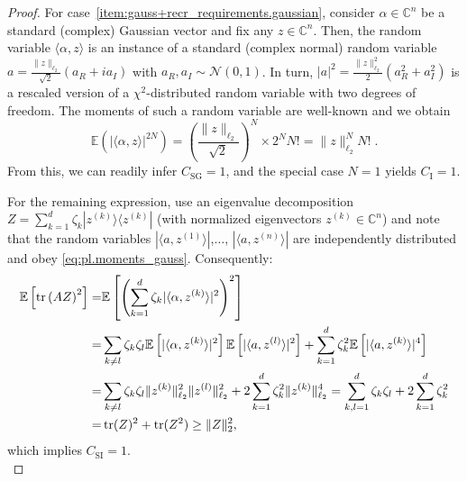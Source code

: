 \begin{proof}
  For case~\ref{item:gauss+recr_requirements.gaussian}, consider $\alpha \in \mathbb{C}^n$ be a standard (complex) Gaussian vector and fix any $ z \in \mathbb{C}^n$.
  Then, the random variable $\langle \alpha, z \rangle$ is an instance of a standard (complex normal) random variable $a = \tfrac{\|  z \|_{\ell_2}}{\sqrt{2}} \left(a_R + i a_I\right)$ with $a_R, a_I \sim \mathcal{N}(0,1)$.
  In turn, $|a|^2 = \frac{\|  z \|_{\ell_2}^2}{2} (a_R^2 + a_I^2)$ is a rescaled version of a $\chi^2$-distributed random variable with two degrees of freedom.
  The moments of such a random variable are well-known and we obtain
  \[
    \mathbb{E} (| \langle \alpha, z \rangle|^{2N})= \left( \frac{ \|  z \|_{\ell_2}}{\sqrt{2}}\right)^N \times 2^N N! = \|  z \|_{\ell_2}^N N! \; .\label{eq:pl.moments_gauss}
  \]
  From this, we can readily infer $C_\mathrm{SG} = 1$, and the special case $N=1$  yields $C_\mathrm{I}=1$.

  For the remaining expression, use an eigenvalue decomposition $ Z = \sum_{k=1}^d \zeta_k | z^{(k)} \rangle \langle  z^{(k)}|$ (with normalized eigenvectors $ z^{(k)}\in \mathbb{C}^n$) and note that the random variables $|\langle  a, z^{(1)} \rangle|$,$\ldots$, $| \langle  a, z^{(n)} \rangle|$ are independently distributed and obey \cref{eq:pl.moments_gauss}.
  Consequently:
  \begin{align}
    \mathbb{E} \left[ \operatorname{tr} \left(  A  Z \right)^2 \right]
    =& \mathbb{E} \left[ \left( \sum_{k=1}^d \zeta_k | \langle \alpha, z^{(k)} \rangle|^2 \right)^2 \right] \\
    =& \sum_{k \neq l} \zeta_k \zeta_l \mathbb{E} \left[ |\langle \alpha, z^{(k)} \rangle|^2 \right] \mathbb{E} \left[ | \langle  a, z^{(l)} \rangle|^2 \right]
    + \sum_{k=1}^d \zeta_k^2 \mathbb{E} \left[ | \langle  a,  z^{(k)} \rangle|^4 \right] \\
    =& \sum_{k \neq l} \zeta_k \zeta_l \| z^{(k)} \|_{\ell_2}^2 \|  z^{(l)} \|_{\ell_2}^2 + 2 \sum_{k=1}^d \zeta_k^2 \|  z^{(k)} \|_{\ell_2}^4
    = \sum_{k,l=1}^d \zeta_k \zeta_l + 2\sum_{k=1}^d \zeta_k^2 \\
    =& \operatorname{tr} ( Z)^2 + \operatorname{tr} ( Z^2)
    \geq \|  Z \|_2^2,
  \end{align}
  which implies $C_\mathrm{SI} = 1$.\\




\end{proof}
